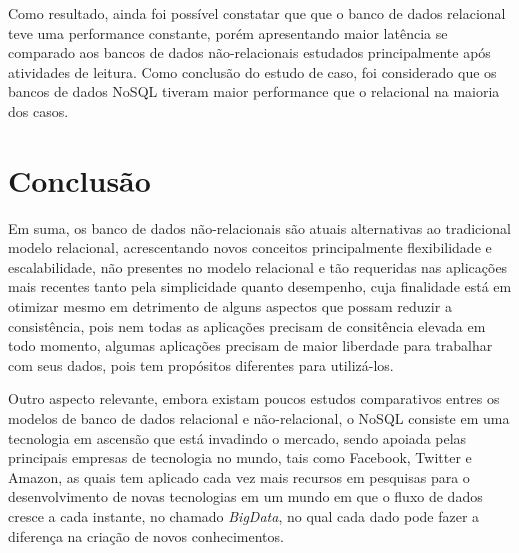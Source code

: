 \documentclass[12pt]{article}
\begin{document}
Como resultado, ainda foi possível constatar que que o banco de dados relacional teve uma performance constante, porém apresentando maior latência se comparado aos bancos de dados não-relacionais estudados principalmente após atividades de leitura. Como conclusão do estudo de caso, foi considerado que os bancos de dados NoSQL tiveram maior performance que o relacional na maioria dos casos.

\section{Conclusão}
\label{sec:conclusao}

Em suma, os banco de dados não-relacionais são atuais alternativas ao tradicional modelo relacional, acrescentando novos conceitos principalmente flexibilidade e escalabilidade, não presentes no modelo relacional e tão requeridas nas aplicações mais recentes tanto pela simplicidade quanto desempenho, cuja finalidade está em otimizar mesmo em detrimento de alguns aspectos que possam reduzir a consistência, pois nem todas as aplicações precisam de consitência elevada em todo momento, algumas aplicações precisam de maior liberdade para trabalhar com seus dados, pois tem propósitos diferentes para utilizá-los.

Outro aspecto relevante, embora existam poucos estudos comparativos entres os modelos de banco de dados relacional e não-relacional, o NoSQL consiste em uma tecnologia em ascensão que está invadindo o mercado, sendo apoiada pelas principais empresas de tecnologia no mundo, tais como Facebook, Twitter e Amazon, as quais tem aplicado cada vez mais recursos em pesquisas para o desenvolvimento de novas tecnologias em um mundo em que o fluxo de dados cresce a cada instante, no chamado \textit{BigData}, no qual cada dado pode fazer a diferença na criação de novos conhecimentos.



\end{document}
